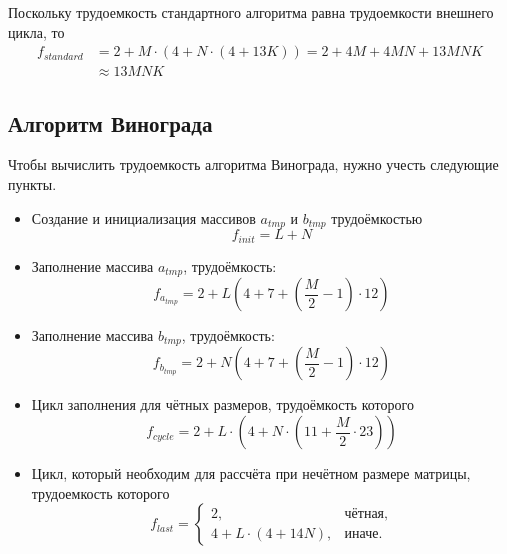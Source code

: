 Поскольку трудоемкость стандартного алгоритма равна трудоемкости внешнего цикла, то
\begin{align}
	\label{for:standard}
	f_{standard} &= 2 + M \cdot (4 + N \cdot (4 + 13K)) = 2 + 4M + 4MN + 13MNK\\ &\approx 13MNK
\end{align}


\subsection{Алгоритм Винограда}

Чтобы вычислить трудоемкость алгоритма Винограда, нужно учесть следующие пункты.

\begin{itemize}
	\item Создание и инициализация массивов $a_{tmp}$ и $b_{tmp}$ трудоёмкостью %
	\begin{equation}
		\label{for:init}
		f_{init} = L + N
	\end{equation}
	
	\item Заполнение массива $a_{tmp}$, трудоёмкость: %
	\begin{equation}
		\label{for:ATMP}
		f_{a_{tmp}} = 2 + L (4 + 7 +  (\frac{M}{2} - 1)  \cdot 12)
	\end{equation}
	
	\item Заполнение массива $b_{tmp}$, трудоёмкость: %
	\begin{equation}
		\label{for:BTMP}
		f_{b_{tmp}} = 2 + N (4 + 7 + (\frac{M}{2} - 1) \cdot 12)
	\end{equation}
	
	\item Цикл заполнения для чётных размеров, трудоёмкость которого %
	\begin{equation}
		\label{sfor:cycle}
		f_{cycle} = 2 + L \cdot (4 + N \cdot (11 + \frac{M}{2} \cdot 23))
	\end{equation}
	
	\item Цикл, который необходим для рассчёта при нечётном размере матрицы, трудоемкость которого
	\newpage
	\begin{equation}
		\label{for:last}
		f_{last} = \begin{cases}
			2, & \text{чётная,}\\
			4 + L \cdot (4 + 14N), & \text{иначе.}
		\end{cases}
	\end{equation}
\end{itemize}

